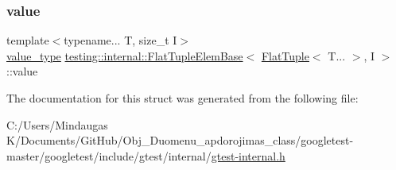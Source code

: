 \subsubsection{\texorpdfstring{value}{value}}
{\footnotesize\ttfamily template$<$typename... T, size\+\_\+t I$>$ \\
\mbox{\hyperlink{structtesting_1_1internal_1_1_flat_tuple_elem_base_3_01_flat_tuple_3_01_t_8_8_8_01_4_00_01_i_01_4_a6b87a445f87724f9363b348e6c697766}{value\+\_\+type}} \mbox{\hyperlink{structtesting_1_1internal_1_1_flat_tuple_elem_base}{testing\+::internal\+::\+Flat\+Tuple\+Elem\+Base}}$<$ \mbox{\hyperlink{classtesting_1_1internal_1_1_flat_tuple}{Flat\+Tuple}}$<$ T... $>$, I $>$\+::value}



The documentation for this struct was generated from the following file\+:\begin{DoxyCompactItemize}
\item 
C\+:/\+Users/\+Mindaugas K/\+Documents/\+Git\+Hub/\+Obj\+\_\+\+Duomenu\+\_\+apdorojimas\+\_\+class/googletest-\/master/googletest/include/gtest/internal/\mbox{\hyperlink{googletest-master_2googletest_2include_2gtest_2internal_2gtest-internal_8h}{gtest-\/internal.\+h}}\end{DoxyCompactItemize}
